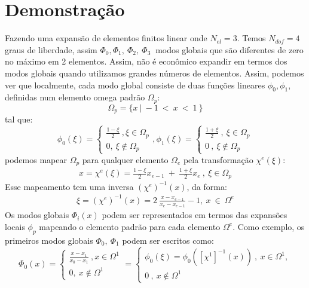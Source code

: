 \section{Demonstração}
 Fazendo uma expansão de elementos finitos linear onde $N_{el} =3$. Temos $N_{dof} = 4$ graus de liberdade, assim
 $\Phi_0,\Phi_1,\ \Phi_2,\ \Phi_3\ $ modos globais que são diferentes de zero no máximo em 2 elementos. Assim, não é econômico expandir em termos dos modos globais quando utilizamos grandes números de elementos.
 Assim, podemos ver que localmente, cada modo global consiste de duas funções lineares $\phi_0,\phi_1$, definidas num elemento omega padrão $\Omega_p$:
\begin{equation}
	\Omega_p = \{x\ |\ -1\ <\ x\ <\ 1\ \}
\end{equation}
tal que:
\begin{equation}\phi_0(\xi) = \left\{\begin{matrix}
\frac{1- \xi}{2}\ , \xi \in \Omega_p \\
0,\ \xi \notin \Omega_p
\end{matrix}\right.,
\phi_1(\xi) = \left\{\begin{matrix}
\frac{1 + \xi}{2}\ ,\ \xi \in \Omega_p \\
0\ ,\ \xi \notin \Omega_p
\end{matrix}\right.
\end{equation}
podemos mapear $\Omega_p$ para qualquer elemento $\Omega_e$ pela transformação  $\chi^e(\xi) $:
\begin{align}
x = \chi^e(\xi) = \frac{1-\xi}{2}x_{e-1}\ +\ \frac{1+\xi}{2}x_{e}\ ,\  \xi \in \Omega_{p}
\end{align}
 Esse mapeamento tem uma inversa $ (\chi^e) ^{-1}(x)$, da forma:
\begin{align}
\xi = (\chi^e) ^{-1}(x) = 2\ \frac{x - x_{e-1}}{x_{e} - x_{e-1}} - 1,\ x\ \in \   \Omega^e
\end{align}
 Os modos globais $\Phi_i(x)$ podem ser representados em termos das expansões locais $\phi_p$ mapeando o elemento padrão para cada elemento $\Omega^e$. Como exemplo, os primeiros modos globais $\Phi_0,\ \Phi_1$ podem ser escritos como:
\begin{equation}
\Phi_0(x) = \left\{\begin{matrix}
\frac{x - x_1}{x_0 - x_1}\ , x \in \Omega^1 \\
0,\ x \notin \Omega^1
\end{matrix}\right. = \left\{\begin{matrix}
\phi_0(\xi) = \phi_0( [\chi^1] ^{-1}(x) )\ ,\ x \in \Omega^1, \\
0\ ,\ x \notin \Omega^1
\end{matrix}\right.
\end{equation}
